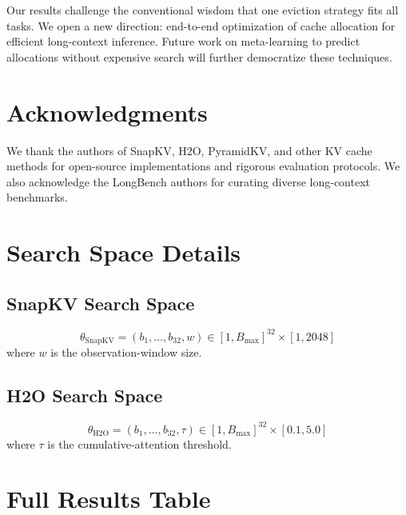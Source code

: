 \documentclass[11pt,a4paper]{article}
\begin{document}
Our results challenge the conventional wisdom that one eviction strategy fits all tasks. We open a new direction: end-to-end optimization of cache allocation for efficient long-context inference. Future work on meta-learning to predict allocations without expensive search will further democratize these techniques.

\section*{Acknowledgments}

We thank the authors of SnapKV, H2O, PyramidKV, and other KV cache methods for open-source implementations and rigorous evaluation protocols. We also acknowledge the LongBench authors for curating diverse long-context benchmarks.




\appendix

\section{Search Space Details}

\subsection{SnapKV Search Space}
\[
\theta_{\text{SnapKV}} = (b_1, \ldots, b_{32}, w) \in [1, B_{\max}]^{32} \times [1, 2048]
\]
where $w$ is the observation-window size.

\subsection{H2O Search Space}
\[
\theta_{\text{H2O}} = (b_1, \ldots, b_{32}, \tau) \in [1, B_{\max}]^{32} \times [0.1, 5.0]
\]
where $\tau$ is the cumulative-attention threshold.

\section{Full Results Table}
\end{document}
